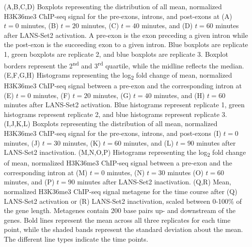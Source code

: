 \documentclass[11pt]{biorxiv}
\begin{document}
\noindent (A,B,C,D) Boxplots representing the distribution of all mean, normalized H3K36me3 ChIP-seq signal for the pre-exons, introns, and post-exons at (A) $t=0$ minutes, (B) $t=20$ minutes, (C) $t=40$ minutes, and (D) $t=60$ minutes after LANS-Set2 activation. A pre-exon is the exon preceding a given intron while the post-exon is the succeeding exon to a given intron. Blue boxplots are replicate 1, green boxplots are replicate 2, and blue boxplots are replicate 3. Boxplot borders represent the 2\textsuperscript{nd} and 3\textsuperscript{rd} quartile, while the midline reflects the median. (E,F,G,H) Histograms representing the log\textsubscript{2} fold change of mean, normalized H3K36me3 ChIP-seq signal between a pre-exon and the corresponding intron at (E) $t=0$ minutes, (F) $t=20$ minutes, (G) $t=40$ minutes, and (H) $t=60$ minutes after LANS-Set2 activation. Blue histograms represent replicate 1, green histograms represent replicate 2, and blue histograms represent replicate 3. (I,J,K,L) Boxplots representing the distribution of all mean, normalized H3K36me3 ChIP-seq signal for the pre-exons, introns, and post-exons (I) $t=0$ minutes, (J) $t=30$ minutes, (K) $t=60$ minutes, and (L) $t=90$ minutes after LANS-Set2 inactivation. (M,N,O,P) Histograms representing the log\textsubscript{2} fold change of mean, normalized H3K36me3 ChIP-seq signal between a pre-exon and the corresponding intron at (M) $t=0$ minutes, (N) $t=30$ minutes (O) $t=60$ minutes, and (P) $t=90$ minutes after LANS-Set2 inactivation. (Q,R) Mean, normalized H3K36me3 ChIP-seq signal metagene for the time course after (Q) LANS-Set2 activation or (R) LANS-Set2 inactivation, scaled between 0-100\% of the gene length. Metagenes contain 200 base pairs up- and downstream of the genes. Bold lines represent the mean across all three replicates for each time point, while the shaded bands represent the standard deviation about the mean. The different line types indicate the time points.

\clearpage
\end{document}
